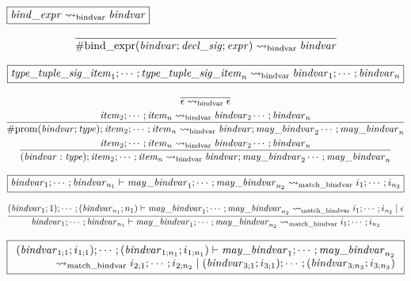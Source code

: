 $\fbox{$\mathit{bind\_expr} \rightsquigarrow_\mathrm{bindvar} \mathit{bindvar}$}$

\begin{gather*}
    \infer{\mathrm{\#bind\_expr}(\mathit{bindvar}; \mathit{decl\_sig}; \mathit{expr}) \rightsquigarrow_\mathrm{bindvar} \mathit{bindvar}}{}
\end{gather*}

$\fbox{$\mathit{type\_tuple\_sig\_item}_1; \cdots; \mathit{type\_tuple\_sig\_item}_n \rightsquigarrow_\mathrm{bindvar} \mathit{bindvar}_1; \cdots; \mathit{bindvar}_n$}$

\begin{gather*}
    \infer{\epsilon \rightsquigarrow_\mathrm{bindvar} \epsilon}{}
    \\
    \infer{\mathrm{\#prom}(\mathit{bindvar}; \mathit{type}); \mathit{item}_2; \cdots; \mathit{item}_n \rightsquigarrow_\mathrm{bindvar} \mathit{bindvar}; \mathit{may\_bindvar}_2 \cdots; \mathit{may\_bindvar}_n}{
        \mathit{item}_2; \cdots; \mathit{item}_n \rightsquigarrow_\mathrm{bindvar} \mathit{bindvar}_2 \cdots; \mathit{bindvar}_n
    }
    \\
    \infer{(\mathit{bindvar}: \mathit{type}); \mathit{item}_2; \cdots; \mathit{item}_n \rightsquigarrow_\mathrm{bindvar} \mathit{bindvar}; \mathit{may\_bindvar}_2 \cdots; \mathit{may\_bindvar}_n}{
        \mathit{item}_2; \cdots; \mathit{item}_n \rightsquigarrow_\mathrm{bindvar} \mathit{bindvar}_2 \cdots; \mathit{bindvar}_n
    }
\end{gather*}

$\fbox{$\mathit{bindvar}_1; \cdots; \mathit{bindvar}_{n_1} \vdash \mathit{may\_bindvar}_1; \cdots; \mathit{may\_bindvar}_{n_2} \rightsquigarrow_\mathrm{match\_bindvar} i_1; \cdots; i_{n_2}$}$

\begin{gather*}
    \infer{\mathit{bindvar}_1; \cdots; \mathit{bindvar}_{n_1} \vdash \mathit{may\_bindvar}_1; \cdots; \mathit{may\_bindvar}_{n_2} \rightsquigarrow_\mathrm{match\_bindvar} i_1; \cdots; i_{n_2}}{
        (\mathit{bindvar}_1; 1); \cdots; (\mathit{bindvar}_{n_1}; n_1) \vdash \mathit{may\_bindvar}_1; \cdots; \mathit{may\_bindvar}_{n_2} \rightsquigarrow_\mathrm{match\_bindvar} i_1; \cdots; i_{n_2} \mid \epsilon
    }
\end{gather*}

$\fbox{$\begin{array}{r}
    (\mathit{bindvar}_{1;1}; i_{1;1}); \cdots; (\mathit{bindvar}_{1;n_1}; i_{1;n_1}) \vdash \mathit{may\_bindvar}_1; \cdots; \mathit{may\_bindvar}_{n_2}
    \\
    \rightsquigarrow_\mathrm{match\_bindvar} i_{2;1}; \cdots; i_{2;n_2} \mid (\mathit{bindvar}_{3;1}; i_{3;1}); \cdots; (\mathit{bindvar}_{3;n_3}; i_{3;n_3})
\end{array}$}$


